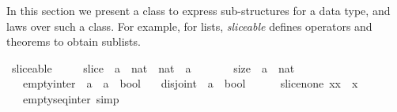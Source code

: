 %
\begin{isabellebody}%
%
%
\begin{isamarkuptext}%
\label{sec:theory-sliceable}%
\end{isamarkuptext}\isamarkuptrue%
%
\isadelimtheory
%
\endisadelimtheory
%
\isatagtheory
%
\endisatagtheory
{\isafoldtheory}%
%
\isadelimtheory
%
\endisadelimtheory
%
\begin{isamarkuptext}%
In this section we present a class to express sub-structures for a data type, and laws over such a class.
  For example, for lists, \emph{sliceable} defines operators and theorems to obtain sublists.%
\end{isamarkuptext}\isamarkuptrue%
\isamarkupfalse%
\ sliceable\ {\isacharequal}\ \isanewline
\ \ \ slice\ {\isacharcolon}{\isacharcolon}\ {\isachardoublequoteopen}{\isacharprime}a\ {\isasymRightarrow}\ nat\ {\isasymRightarrow}\ nat\ {\isasymRightarrow}\ {\isacharprime}a{\isachardoublequoteclose}\ {\isacharparenleft}{\isachardoublequoteopen}{\isacharparenleft}{}{\isacharunderscore}{\isasymdagger}{\isacharunderscore}{\isachardot}{\isachardot}{\isacharunderscore}{\isacharparenright}{\isachardoublequoteclose}\ \ {\isacharbrackleft}{}{}{\isacharcomma}{}{}{\isacharcomma}{}{}{\isacharbrackright}\ {}{}{\isacharparenright}\isanewline
\ \ \ size\ {\isacharcolon}{\isacharcolon}\ {\isachardoublequoteopen}{\isacharprime}a\ {\isasymRightarrow}\ nat{\isachardoublequoteclose}\ {\isacharparenleft}{\isachardoublequoteopen}{\isacharparenleft}{}{\isacharhash}{\isacharunderscore}{\isacharparenright}{\isachardoublequoteclose}\ {}{}{\isacharparenright}\isanewline
\ \ \ empty{\isacharunderscore}inter\ {\isacharcolon}{\isacharcolon}\ {\isachardoublequoteopen}{\isacharprime}a\ {\isasymRightarrow}\ {\isacharprime}a\ {\isasymRightarrow}\ bool{\isachardoublequoteclose}\isanewline
\ \ \ disjoint\ {\isacharcolon}{\isacharcolon}\ {\isachardoublequoteopen}{\isacharprime}a\ {\isasymRightarrow}\ bool{\isachardoublequoteclose}\isanewline
\ \ \isanewline
\ \ \ slice{\isacharunderscore}none{\isacharcolon}\ {\isachardoublequoteopen}x{\isasymdagger}{}{\isachardot}{\isachardot}{\isacharparenleft}{\isacharhash}x{\isacharparenright}\ {\isacharequal}\ x{\isachardoublequoteclose}\isanewline
\ \ \ empty{\isacharunderscore}seq{\isacharunderscore}inter\ {\isacharbrackleft}simp{\isacharbrackright}{\isacharcolon}\ \isanewline

\end{isabellebody}
